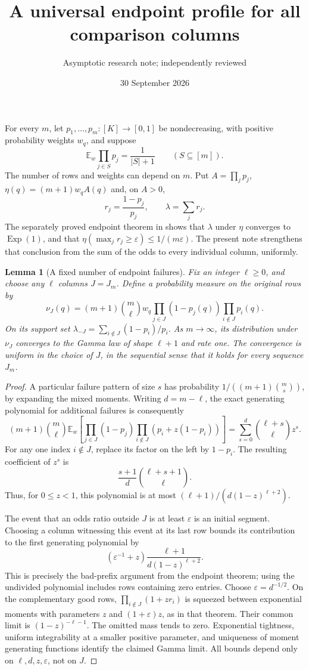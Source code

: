 \documentclass[11pt]{article}
\title{A universal endpoint profile for all comparison columns}
\author{Asymptotic research note; independently reviewed}
\date{30 September 2026}
\newtheorem{lemma}{Lemma}
\newcommand{\E}{\mathbb E}
\begin{document}
\maketitle
For every $m$, let $p_1,\ldots,p_m:[K]\to[0,1]$ be nondecreasing,
with positive probability weights $w_q$, and suppose
\[
 \E_w\prod_{j\in S}p_j=\frac1{|S|+1}\qquad(S\subseteq[m]).
\]
The number of rows and weights can depend on $m$.
Put $A=\prod_jp_j$, $\eta(q)=(m+1)w_qA(q)$ and, on $A>0$,
\[
 r_j=\frac{1-p_j}{p_j},\qquad \lambda=\sum_jr_j.
\]
The separately proved endpoint theorem in
shows that $\lambda$ under $\eta$ converges to $\operatorname{Exp}(1)$,
and that $\eta(\max_jr_j\ge\varepsilon)\le1/(m\varepsilon)$.
The present note strengthens that conclusion from the sum of the odds
to every individual column, uniformly.

\begin{lemma}[A fixed number of endpoint failures]\label{gamma}
Fix an integer $\ell\ge0$, and choose any $\ell$ columns $J=J_m$.
Define a probability measure on the original rows by
\[
 \nu_J(q)=(m+1)\binom m\ell w_q
       \prod_{j\in J}(1-p_j(q))\prod_{i\notin J}p_i(q).
\]
On its support set $\lambda_{-J}=\sum_{i\notin J}(1-p_i)/p_i$.
As $m\to\infty$, its distribution under $\nu_J$ converges to the
Gamma law of shape $\ell+1$ and rate one. The convergence is uniform
in the choice of $J$, in the sequential sense that it holds for every
sequence $J_m$.
\end{lemma}
\begin{proof}
A particular failure pattern of size $s$ has probability
$1/((m+1)\binom ms)$, by expanding the mixed moments.
Writing $d=m-\ell$, the exact generating polynomial for additional
failures is consequently
\[
 (m+1)\binom m\ell\E_w\left[
  \prod_{j\in J}(1-p_j)
  \prod_{i\notin J}(p_i+z(1-p_i))\right]
 =\sum_{s=0}^{d}\binom{\ell+s}{\ell}z^s.
\]
For any one index $i\notin J$, replace its factor on the left by
$1-p_i$. The resulting coefficient of $z^s$ is
\[
 \frac{s+1}{d}\binom{\ell+s+1}{\ell}.
\]
Thus, for $0\le z<1$, this polynomial is at most
$(\ell+1)/(d(1-z)^{\ell+2})$.

The event that an odds ratio outside $J$ is at least $\varepsilon$
is an initial segment. Choosing a column witnessing this event at
its last row bounds its contribution to the first generating
polynomial by
\[
 (\varepsilon^{-1}+z)
 \frac{\ell+1}{d(1-z)^{\ell+2}}.
\]
This is precisely the bad-prefix argument from the endpoint theorem;
using the undivided polynomial includes rows containing zero entries.
Choose $\varepsilon=d^{-1/2}$. On the complementary good rows,
$\prod_{i\notin J}(1+zr_i)$ is squeezed between exponential moments
with parameters $z$ and $(1+\varepsilon)z$, as in that theorem.
Their common limit is $(1-z)^{-\ell-1}$.
The omitted mass tends to zero. Exponential tightness, uniform
integrability at a smaller positive parameter, and uniqueness of
moment generating functions identify the claimed Gamma limit.
All bounds depend only on $\ell,d,z,\varepsilon$, not on $J$.
\end{proof}
\end{document}
